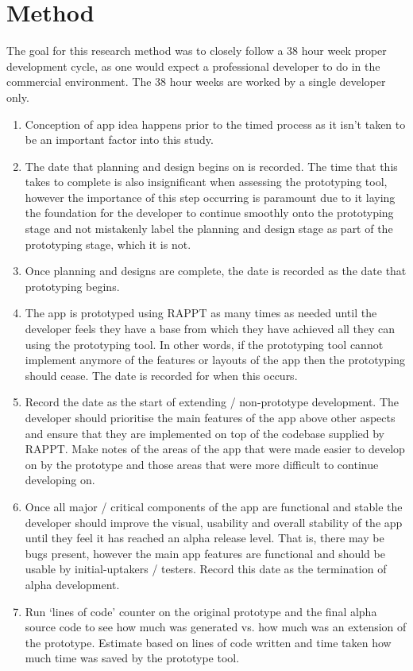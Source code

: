 \documentclass[11pt,english,numbers=endperiod,parskip=half,abstract=on]{scrartcl}
\begin{document}
\section{Method}
  The goal for this research method was to closely follow a 38 hour week
  proper development cycle, as one would expect a professional developer to
  do in the commercial environment. The 38 hour weeks are worked by a single
  developer only.
  \begin{enumerate}
    \item{
      Conception of app idea happens prior to the timed process as it isn't
      taken to be an important factor into this study.
    }
    \item{
      The date that planning and design begins on is recorded. The time that
      this takes to complete is also insignificant when assessing the prototyping
      tool, however the importance of this step occurring is paramount due to it
      laying the foundation for the developer to continue smoothly onto the
      prototyping stage and not mistakenly label the planning and design stage
      as part of the prototyping stage, which it is not.
    }
    \item{
      Once planning and designs are complete, the date is recorded as the
      date that prototyping begins.
    }
    \item{
      The app is prototyped using RAPPT as many times as needed until the
      developer feels they have a base from which they have achieved all they
      can using the prototyping tool. In other words, if the prototyping tool
      cannot implement anymore of the features or layouts of the app then
      the prototyping should cease. The date is recorded for when this occurs.
    }
    \item{
      Record the date as the start of extending / non-prototype development.
      The developer should prioritise the main features of the app above other
      aspects and ensure that they are implemented on
      top of the codebase supplied by RAPPT. Make notes of the areas of the app
      that were made easier to develop on by the prototype and those areas
      that were more difficult to continue developing on.
    }
    \item{
      Once all major / critical components of the app are functional and stable
      the developer should improve the visual, usability and overall stability
      of the app until they feel it has reached an alpha release level. That is,
      there may be bugs present, however the main app features are functional
      and should be usable by initial-uptakers / testers. Record this date
      as the termination of alpha development.
    }
    \item{
      Run `lines of code' counter on the original prototype and the final alpha
      source code to see how much was generated vs. how much was an extension
      of the prototype. Estimate based on lines of code written and time taken
      how much time was saved by the prototype tool.
    }
  \end{enumerate}
\end{document}
